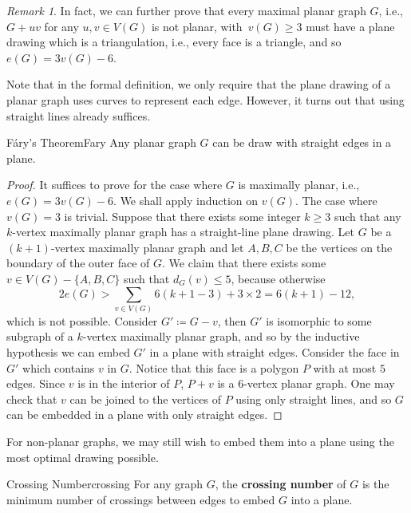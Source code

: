 \documentclass[math, code]{amznotes}
\theoremstyle{remark}
\newtheorem*{remark}{Remark}
\begin{document}
\begin{notebox}
    \begin{remark}
        In fact, we can further prove that every maximal planar graph $G$, i.e., $G + uv$ for any $u, v \in V(G)$ is not planar,  with~$v(G) \geq 3$ must have a plane drawing which is a triangulation, i.e., every face is a triangle, and so~$e(G) = 3v(G) - 6$.
    \end{remark}
\end{notebox}
Note that in the formal definition, we only require that the plane drawing of a planar graph uses curves to represent each edge. However, it turns out that using straight lines already suffices.
\begin{thmbox}{F\'{a}ry's Theorem}{Fary}
    Any planar graph $G$ can be draw with straight edges in a plane.
    \tcblower
    \begin{proof}
        It suffices to prove for the case where $G$ is maximally planar, i.e., $e(G) = 3v(G) - 6$. We shall apply induction on $v(G)$. The case where $v(G) = 3$ is trivial. Suppose that there exists some integer $k \geq 3$ such that any $k$-vertex maximally planar graph has a straight-line plane drawing. Let $G$ be a $(k + 1)$-vertex maximally planar graph and let $A, B, C$ be the vertices on the boundary of the outer face of $G$. We claim that there exists some $v \in V(G) - \{A, B, C\}$ such that $d_G(v) \leq 5$, because otherwise 
        \begin{equation*}
            2e(G) > \sum_{v \in V(G)}6(k + 1 - 3) + 3 \times 2 = 6(k + 1) - 12,
        \end{equation*}
        which is not possible. Consider $G' \coloneqq G - v$, then $G'$ is isomorphic to some subgraph of a $k$-vertex maximally planar graph, and so by the inductive hypothesis we can embed $G'$ in a plane with straight edges. Consider the face in $G'$ which contains $v$ in $G$. Notice that this face is a polygon $P$ with at most $5$ edges. Since $v$ is in the interior of $P$, $P + v$ is a $6$-vertex planar graph. One may check that $v$ can be joined to the vertices of $P$ using only straight lines, and so $G$ can be embedded in a plane with only straight edges.
    \end{proof}
\end{thmbox}
For non-planar graphs, we may still wish to embed them into a plane using the most optimal drawing possible.
\begin{dfnbox}{Crossing Number}{crossing}
    For any graph $G$, the {\color{red} \textbf{crossing number}} of $G$ is the minimum number of crossings between edges to embed $G$ into a plane.
\end{dfnbox}
\end{document}
